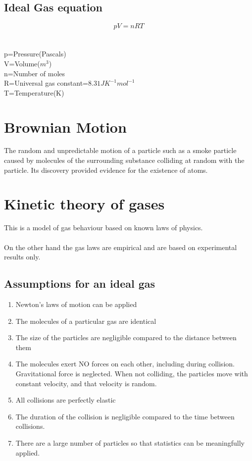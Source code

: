 \documentclass{article}[18pt]
\begin{document}
\subsection{Ideal Gas equation}
$$pV=nRT$$\\
\\
p=Pressure(Pascals)\\
V=Volume($m^3$)\\
n=Number of moles\\
R=Universal gas constant=$8.31JK^{-1}mol^{-1}$\\
T=Temperature(K)
\section{Brownian Motion}
The random and unpredictable motion of a particle such as a smoke particle caused by molecules of the surrounding substance colliding at random with the particle. Its discovery provided evidence for the existence of atoms.
\section{Kinetic theory of gases}
This is a model of gas behaviour based on known laws of physics.\\
\\
On the other hand the gas laws are empirical and are based on experimental results only.\\
\subsection{Assumptions for an ideal gas}
\begin{enumerate}
\item Newton's laws of motion can be applied
\item The molecules of a particular gas are identical
\item The size of the particles are negligible compared to the distance between them
\item The molecules exert NO forces on each other, including during collision. Gravitational force is neglected. When not colliding, the particles move with constant velocity, and that velocity is random.
\item All collisions are perfectly elastic
\item The duration of the collision is negligible compared to the time between collisions.
\item There are a large number of particles so that statistics can be meaningfully applied.
\end{enumerate}
\end{document}
